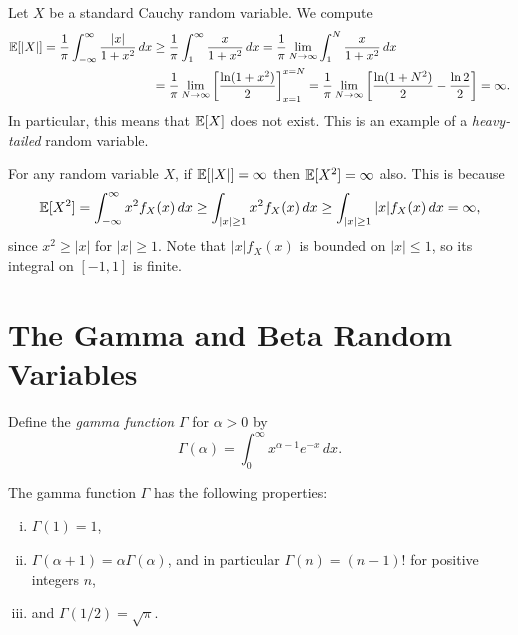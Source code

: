 \begin{example}
  Let $X$ be a standard Cauchy random variable.
  We compute
  \begin{align*}
    \mathbb{E}[|X|] = \frac{1}{\pi} \int_{-\infty}^\infty \frac{|x|}{1 + x^2} \, dx
    &\ge \frac{1}{\pi} \int_1^\infty \frac{x}{1 + x^2}\, dx
    = \frac{1}{\pi} \lim_{N \to \infty} \int_1^N \frac{x}{1 + x^2}\, dx \\
    &= \frac{1}{\pi} \lim_{N \to \infty} \left[\frac{\ln(1 + x^2)}{2}\right]_{x = 1}^{x = N}
    = \frac{1}{\pi} \lim_{N \to \infty} \left[\frac{\ln(1 + N^2)}{2} - \frac{\ln 2}{2}\right]
    = \infty.
  \end{align*}
  In particular, this means that $\mathbb{E}[X]$ does not
  exist. This is an example of a \emph{heavy-tailed}
  random variable.
\end{example}

\begin{remark}
  For any random variable $X$, if $\mathbb{E}[|X|] = \infty$
  then $\mathbb{E}[X^2] = \infty$ also. This is because
  \[
    \mathbb{E}[X^2] = \int_{-\infty}^\infty x^2 f_X(x)\, dx
    \ge \int_{|x| \ge 1} x^2 f_X(x)\, dx
    \ge \int_{|x| \ge 1} |x| f_X(x)\, dx = \infty,
  \]
  since $x^2 \ge |x|$ for $|x| \ge 1$. Note that
  $|x| f_X(x)$ is bounded on $|x| \le 1$, so its
  integral on $[-1, 1]$ is finite.
\end{remark}

\section{The Gamma and Beta Random Variables}
\begin{definition}
  Define the \emph{gamma function} $\Gamma$ for $\alpha > 0$ by
  \[
    \Gamma(\alpha) = \int_0^\infty x^{\alpha - 1} e^{-x} \, dx.
  \]
\end{definition}

\begin{prop}
  The gamma function $\Gamma$ has the following
  properties:
  \begin{enumerate}[(i)]
    \item $\Gamma(1) = 1$,
    \item $\Gamma(\alpha + 1) = \alpha \Gamma(\alpha)$,
      and in particular $\Gamma(n) = (n - 1)!$ for
      positive integers $n$,
    \item and
      $\Gamma(1 / 2) = \sqrt{\pi}$.
  \end{enumerate}
\end{prop}

